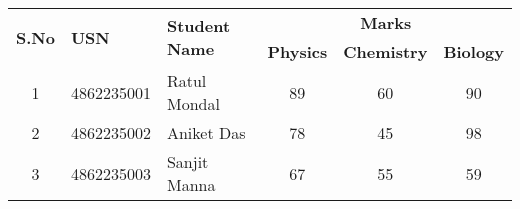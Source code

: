 \documentclass{article}
\begin{document}
\begin{table}[ht]
\centering
\begin{tabular}{|c|p{3cm}|p{3.5cm}|c|c|c|}
\hline
\multirow{2}{*}{\textbf{S.No}} & \multirow{2}{*}{\textbf{USN}} & \multirow{2}{*}{\textbf{Student Name}} & \multicolumn{3}{c|}{\textbf{Marks}} \\
\cline{4-6}
 &  &  & \textbf{Physics} & \textbf{Chemistry} & \textbf{Biology} \\
\hline
1 & 4862235001 & Ratul Mondal & 89 & 60 & 90 \\
2 & 4862235002 & Aniket Das & 78 & 45 & 98 \\
3 & 4862235003 & Sanjit Manna & 67 & 55 & 59 \\
\hline
\end{tabular}
\end{table}
\end{document}
